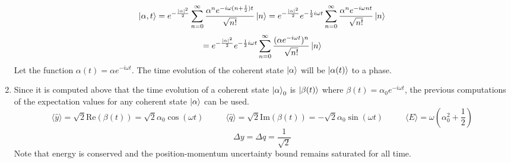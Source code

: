 \begin{sol}
\begin{enumerate}[label=\textbf{(\alph*)}]
\begin{equation}
	\ket{\alpha,t}=e^{-\frac{|\alpha|^2}{2}}\sum_{n=0}^\infty \frac{\alpha^ne^{-i\omega(n+\frac{1}{2} )t}}{\sqrt{n!}}\ket n=e^{-\frac{|\alpha|^2}{2}}e^{-\frac{1}{2}i\omega t}\sum_{n=0}^\infty \frac{\alpha^ne^{-i\omega nt}}{\sqrt{n!}}\ket n
\end{equation}\begin{equation}
	=e^{-\frac{|\alpha|^2}{2}}e^{-\frac{1}{2}i\omega t}\sum_{n=0}^\infty \frac{(\alpha e^{-i\omega t})^n}{\sqrt{n!}}\ket n
\end{equation} 
Let the function $\alpha(t)=\alpha e^{-i\omega t}$. The time evolution of the coherent state $\ket\alpha$ will be $\ket{\alpha(t)}$ to a phase.
\item
Since it is computed above that the time evolution of a coherent state $\ket\alpha_0$ is $\ket{\beta(t)}$ where $\beta(t)=\alpha_0e^{-i\omega t}$, the previous computations of the expectation values for any coherent state $\ket\alpha$ can be used.
\begin{equation}
	\langle\hat y\rangle=\sqrt{2}\text{Re}(\beta(t))=\sqrt{2}\alpha_0\cos(\omega t)\:\:\:\:\:\:\:\:\:\:\:\:\langle\hat q\rangle=\sqrt{2}\text{Im}(\beta(t))=-\sqrt{2}\alpha_0\sin(\omega t)\:\:\:\:\:\:\:\:\:\:\:\:\langle E\rangle = \omega\left(\alpha_0^2+\frac{1}{2}\right)
\end{equation}
\begin{equation}
	\Delta y = \Delta q = \frac{1}{\sqrt 2}
\end{equation}
Note that energy is conserved and the position-momentum uncertainty bound remains saturated for all time.
\end{enumerate}
\end{sol}